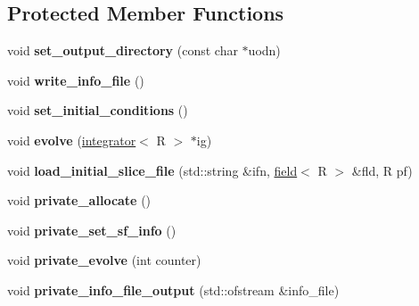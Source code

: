 \subsection*{Protected Member Functions}
\begin{DoxyCompactItemize}
\item 
\hypertarget{classmodel_a9d295f09eb260af90c184498422d2951}{
void {\bfseries set\_\-output\_\-directory} (const char $\ast$uodn)}
\label{classmodel_a9d295f09eb260af90c184498422d2951}

\item 
\hypertarget{classmodel_a2c46925e71c4af596e2e1ea55796d5fc}{
void {\bfseries write\_\-info\_\-file} ()}
\label{classmodel_a2c46925e71c4af596e2e1ea55796d5fc}

\item 
\hypertarget{classmodel_a26254dca4a7bb65302f8ac79ec7d880b}{
void {\bfseries set\_\-initial\_\-conditions} ()}
\label{classmodel_a26254dca4a7bb65302f8ac79ec7d880b}

\item 
\hypertarget{classmodel_a7205d404bf7eda6417fcb2162ad9baa7}{
void {\bfseries evolve} (\hyperlink{classintegrator}{integrator}$<$ R $>$ $\ast$ig)}
\label{classmodel_a7205d404bf7eda6417fcb2162ad9baa7}

\item 
\hypertarget{classmodel_aa16f656be92adeb0dc352480e343af9d}{
void {\bfseries load\_\-initial\_\-slice\_\-file} (std::string \&ifn, \hyperlink{classfield}{field}$<$ R $>$ \&fld, R pf)}
\label{classmodel_aa16f656be92adeb0dc352480e343af9d}

\item 
\hypertarget{classmodel_a3d06bc461cb157407beea8e4fd3c1182}{
void {\bfseries private\_\-allocate} ()}
\label{classmodel_a3d06bc461cb157407beea8e4fd3c1182}

\item 
\hypertarget{classmodel_a2d7c0fefd194dc3220bd155d86ebf32a}{
void {\bfseries private\_\-set\_\-sf\_\-info} ()}
\label{classmodel_a2d7c0fefd194dc3220bd155d86ebf32a}

\item 
\hypertarget{classmodel_a2112bf622835919980b9dcad666420ba}{
void {\bfseries private\_\-evolve} (int counter)}
\label{classmodel_a2112bf622835919980b9dcad666420ba}

\item 
\hypertarget{classmodel_ae729d9cc3fa9b3733523236f300e0ceb}{
void {\bfseries private\_\-info\_\-file\_\-output} (std::ofstream \&info\_\-file)}
\label{classmodel_ae729d9cc3fa9b3733523236f300e0ceb}

\end{DoxyCompactItemize}

